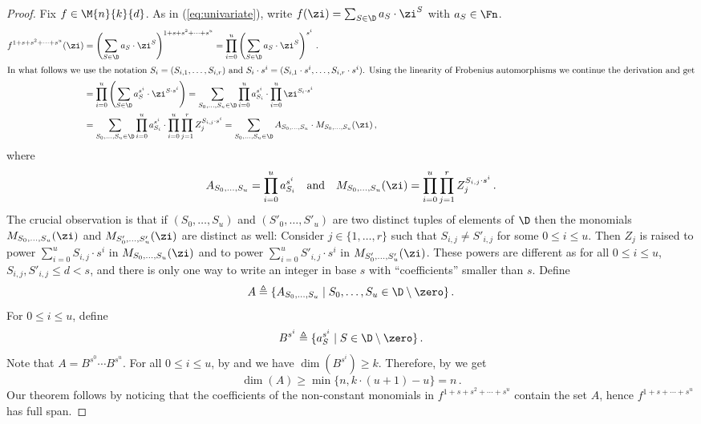 \begin{proof}
Fix $f\in \M{n}{k}{d}$.
As in (\ref{eq:univariate}), write $f(\zi)=\sum_{S\in \D} a_S
\cdot\zi^S$ with $a_S\in \Fn$.
\begin{align*}
f^{1+s+s^2+\cdots +s^u}(\zi) &=
\left(\sum_{S\in \D} a_S \cdot \zi^S\right)^{1+s+s^2+\cdots +s^u}=
\prod_{i=0}^u \left(\sum_{S\in \D} a_S \cdot \zi^S\right)^{s^i}\,.\\
\intertext{In what follows we use the notation $S_i=(S_{i,1},\ldots,S_{i,r})$ and $S_i\cdot s^i=(S_{i,1}\cdot s^i,\ldots,S_{i,r}\cdot s^i)$. Using the linearity of Frobenius automorphisms we continue the derivation and get}
%
%
&= \prod_{i=0}^u \left(\sum_{S\in \D} a_S^{s^i} \cdot \zi^{S\cdot s^i}\right)
=\sum_{S_0,\ldots,S_u \in \D} \prod_{i=0}^u a_{S_i}^{s^i}\cdot\prod_{i=0}^u \zi^{S_i\cdot s^i}\\
&=\sum_{S_0,\ldots,S_u \in \D} \prod_{i=0}^u a_{S_i}^{s^i}\cdot
 \prod_{i=0}^u \prod_{j=1}^r Z_j^{S_{i,j}\cdot s^i} =
 \sum_{S_0,\ldots,S_u \in \D} A_{S_0,\ldots,S_u} \cdot M_{S_0,\ldots,S_u}(\zi)\,,\end{align*}
where 
\[
A_{S_0,\ldots,S_u}=\prod_{i=0}^u a_{S_i}^{s^i}\quad\text{and}\quad
M_{S_0,\ldots,S_u}(\zi)=\prod_{i=0}^u \prod_{j=1}^r Z_j^{S_{i,j}\cdot
  s^i}\,.
\]
The crucial observation is that if $(S_0,\ldots, S_u)$ and $(S'_0,\ldots, S'_u)$ are two distinct tuples of elements of $\D$ then the monomials $M_{S_0,\ldots, S_u}(\zi)$
and $M_{S'_0,\ldots, S'_u}(\zi)$ are distinct as well:
Consider $j\in\{1,\ldots,r\}$ such that $S_{i,j}\neq S'_{i,j}$ for some $0\leq i \leq u$.
Then $Z_j$ is raised to power $\sum_{i=0}^u S_{i,j}\cdot s^i$ in $M_{S_0,\ldots, S_u}(\zi)$
and to power $\sum_{i=0}^u S'_{i,j}\cdot s^i$
in $M_{S'_0,\ldots, S'_u}(\zi)$.
These powers are different as for all $0\leq i \leq u$,
$S_{i,j},S'_{i,j}\leq d<s$, and there is only one way to write an integer in base $s$ with ``coefficients'' smaller than $s$.
Define    %
\[
A\triangleq \{A_{S_0,\ldots,S_u}\mid S_0,\ldots,S_u\in
\D\setminus\zero\}\,.
\]
 For $0\leq i \leq u$,
define    %
\[
B^{s^i}\triangleq \{a_S^{s^i}\mid  S\in \D\setminus \zero\}\,.
\]
Note that $A = B^{s^0}\cdots B^{s^u}$.
For all $0\leq i \leq u$, by  and 
we have $\dim(B^{s^i})\geq k$.
Therefore, by  we get
\[\dim(A)\geq \min\{n, k\cdot (u+1) - u\}=n\,.\]
 Our theorem follows by noticing that the coefficients of the non-constant monomials in  $f^{1+s+s^2+\cdots +  s^u}$
 contain the set $A$, hence $f^{1+s+\cdots+s^u}$ has full span.
\end{proof}

